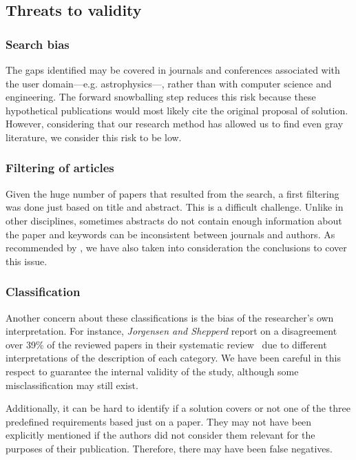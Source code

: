 \subsection{Threats to validity}
\subsubsection{Search bias}
The gaps identified may be covered in
journals and conferences associated with the user domain---e.g. astrophysics---,
rather than with computer science and engineering. The forward snowballing
step reduces this risk because these hypothetical publications would most likely
cite the original proposal of solution. However, considering that our research method has
allowed us to find even gray literature, we consider this risk to be low.

\subsubsection{Filtering of articles}
Given the huge number of papers that resulted from the search,
a first filtering was done just based on title and abstract.
This is a difficult challenge. Unlike in other disciplines, sometimes abstracts
do not contain enough information about the paper and keywords can be inconsistent
between journals and authors\cite{Budgen2008,Brereton2007,Jalali2012}.
As recommended by \cite{Brereton2007}, we have also taken into consideration
the conclusions to cover this issue.

\subsubsection{Classification}
Another concern about these classifications is the bias of the researcher's own
interpretation\cite{MacLure2005}.
For instance, \emph{Jorgensen and Shepperd} report on a disagreement over
39\% of the reviewed papers in their systematic review~\cite{Jorgensen2007}
due to different interpretations of the description of each category. We
have been careful in this respect to guarantee the internal validity of the
study, although some misclassification may still exist.

Additionally, it can be hard to identify if a solution covers or not one of the
three predefined requirements based just on a paper. They may not have been
explicitly mentioned if the authors did not consider them relevant for the
purposes of their publication. Therefore, there may have been false negatives.

